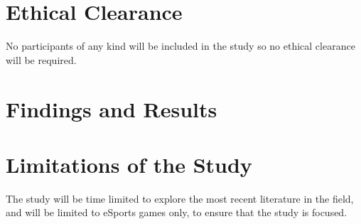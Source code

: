\documentclass[10pt,twoside]{article}
\begin{document}
\section{Ethical Clearance}
No participants of any kind will be included in the study so no ethical clearance will be required.

\section{Findings and Results}


\section{Limitations of the Study}
The study will be time limited to explore the most recent literature in the field, and will be limited to eSports games only, to ensure that the study is focused.



\end{document}
